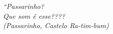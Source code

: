 \documentclass[
	oldfontcommands,
	sumario=tradicional,
	12pt,      %
	openright, %
	oneside,   %
	a4paper,   %
	english, %
	brazil   %
	]{imecc-unicamp}
\begin{document}
			\begin{epigrafe}
				\vspace*{\fill}
				\begin{flushright}
				\textit{``Passarinho? \\
					Que som é esse???? \\
					(Passarinho, Castelo Ra-tim-bum)
				}
				\end{flushright}
			\end{epigrafe}
		
			
		
		
		
		
			
			
			
			\tableofcontents*
			\cleardoublepage
		
\end{document}
